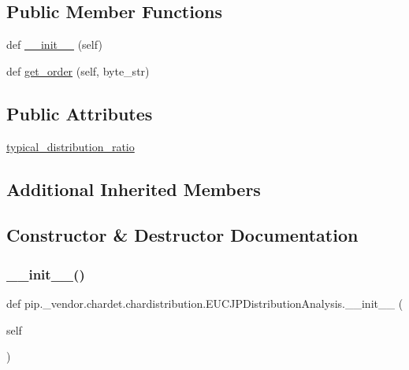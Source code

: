 \subsection*{Public Member Functions}
\begin{DoxyCompactItemize}
\item 
def \hyperlink{classpip_1_1__vendor_1_1chardet_1_1chardistribution_1_1EUCJPDistributionAnalysis_a6f6c327fb98cba76a2e8d64c3080af9c}{\+\_\+\+\_\+init\+\_\+\+\_\+} (self)
\item 
def \hyperlink{classpip_1_1__vendor_1_1chardet_1_1chardistribution_1_1EUCJPDistributionAnalysis_a29ce0aff65ee966bcd1669b45c21e859}{get\+\_\+order} (self, byte\+\_\+str)
\end{DoxyCompactItemize}
\subsection*{Public Attributes}
\begin{DoxyCompactItemize}
\item 
\hyperlink{classpip_1_1__vendor_1_1chardet_1_1chardistribution_1_1EUCJPDistributionAnalysis_a246c08a1e3acd25e13f6cb5359b0858e}{typical\+\_\+distribution\+\_\+ratio}
\end{DoxyCompactItemize}
\subsection*{Additional Inherited Members}


\subsection{Constructor \& Destructor Documentation}
\mbox{\label{classpip_1_1__vendor_1_1chardet_1_1chardistribution_1_1EUCJPDistributionAnalysis_a6f6c327fb98cba76a2e8d64c3080af9c}} 
\subsubsection{\texorpdfstring{\+\_\+\+\_\+init\+\_\+\+\_\+()}{\_\_init\_\_()}}
{\footnotesize\ttfamily def pip.\+\_\+vendor.\+chardet.\+chardistribution.\+E\+U\+C\+J\+P\+Distribution\+Analysis.\+\_\+\+\_\+init\+\_\+\+\_\+ (\begin{DoxyParamCaption}\item[{}]{self }\end{DoxyParamCaption})}



